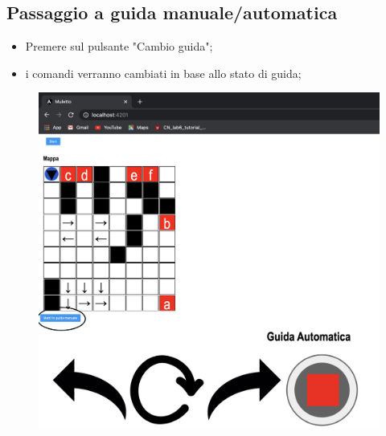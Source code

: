 \subsection{Passaggio a guida manuale/automatica}
\begin{itemize}
    \item Premere sul pulsante "Cambio guida";
    \item i comandi verranno cambiati in base allo stato di guida;
\end{itemize}
\begin{figure}[H]
    \centering
    \includegraphics[scale=0.4]{res/images/forklift_cambioguida.png}
\end{figure}
